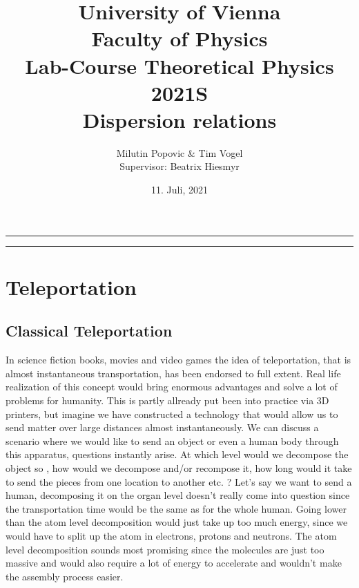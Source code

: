 \documentclass[a4paper]{article}
\title{University of Vienna\\ Faculty of Physics\\
\vspace{1.25cm}Lab-Course Theoretical Physics 2021S \\ Dispersion relations
}
\author{Milutin Popovic \& Tim Vogel \vspace{1cm}\\ Supervisor: Beatrix Hiesmyr}
\date{11. Juli, 2021}
\begin{document}
\maketitle
\noindent\rule[0.5ex]{\linewidth}{1pt}
\begin{abstract}
\end{abstract}
\noindent\rule[0.5ex]{\linewidth}{1pt}

\tableofcontents
\section{Teleportation}
\subsection{Classical Teleportation}
In science fiction books, movies and video games the idea of teleportation,
that is almost instantaneous transportation, has been endorsed to full extent.
Real life realization of this concept would bring enormous advantages and solve
a lot of problems for humanity. This is partly allready put been into practice via
3D printers, but imagine we have constructed a technology that would allow us
to send matter over large distances almost instantaneously. We can discuss a
scenario where we would like to send an object or even a human body through
this apparatus, questions instantly arise.  At which level would we decompose
the object so , how would we decompose and/or recompose it, how long would it take to send
the pieces from one location to another etc. ? Let's say we want to send a
human, decomposing it on the organ level doesn't really come into question
since the transportation time would be the same as for the whole human.
Going lower than the atom level decomposition would just take up too much
energy, since we would have to split up the atom in electrons, protons and
neutrons. The atom level decomposition sounds most promising since the
molecules are just too massive and would also require a lot of energy to
accelerate and wouldn't make the assembly process easier.
\end{document}
